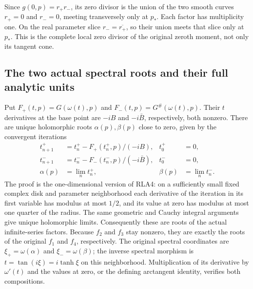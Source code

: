 Since $g(0,p)=r_+r_-$, its zero divisor is the union of the two
smooth curves $r_+=0$ and $r_-=0$, meeting transversely only at $p_*$.
Each factor has multiplicity one.  On the real parameter slice
$r_-=\overline{r_+}$, so their union meets that slice only at $p_*$.
This is the complete local zero divisor of the original zeroth
moment, not only its tangent cone.

\subsection{The two actual spectral roots and their full analytic units}

Put $F_+(t,p)=G(\omega(t),p)$ and
$F_-(t,p)=G^\#(\omega(t),p)$.
Their $t$ derivatives at the base point are $-iB$ and
$-i\bar B$, respectively, both nonzero.  There are unique
holomorphic roots $\alpha(p),\beta(p)$ close to zero, given by the
convergent iterations
\[
\begin{aligned}
 t^+_{n+1}&=t^+_n-F_+(t^+_n,p)/(-iB),&t^+_0&=0,\\
 t^-_{n+1}&=t^-_n-F_-(t^-_n,p)/(-i\bar B),&t^-_0&=0,\\
 \alpha(p)&=\lim_nt^+_n,&\beta(p)&=\lim_nt^-_n.
\end{aligned}\tag{RLA5}
\]
The proof is the one-dimensional version of RLA4: on a sufficiently
small fixed complex disk and parameter neighborhood each derivative
of the iteration in its first variable has modulus at most $1/2$,
and its value at zero has modulus at most one quarter of the radius.
The same geometric and Cauchy integral arguments give unique
holomorphic limits.  Consequently these are roots of the actual
infinite-series factors.  Because $f_2$ and $f_3$ stay nonzero, they
are exactly the roots of the original $f_1$ and $f_4$, respectively.
The original spectral coordinates are
$\xi_+=\omega(\alpha)$ and $\xi_-=\omega(\beta)$; the inverse
spectral morphism is $t=\tan(i\xi)=i\tanh\xi$ on this neighborhood.
Multiplication of its derivative by $\omega'(t)$ and the values at
zero, or the defining arctangent identity, verifies both compositions.


